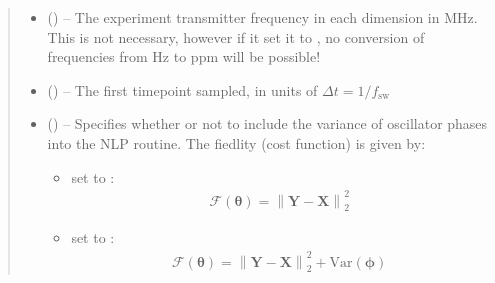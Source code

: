 \documentclass[letterpaper,10pt,english]{sphinxmanual}
\begin{document}
\begin{fulllineitems}
\begin{quote}
\begin{description}
\begin{itemize}
\item {} 
\sphinxAtStartPar
{} (\sphinxstyleliteralemphasis{\sphinxupquote{{[}}}\sphinxstyleliteralemphasis{\sphinxupquote{{]}}}\sphinxstyleliteralemphasis{\sphinxupquote{, }}\sphinxstyleliteralemphasis{\sphinxupquote{{[}}}\sphinxstyleliteralemphasis{\sphinxupquote{, }}\sphinxstyleliteralemphasis{\sphinxupquote{{]} or }}\sphinxstyleliteralemphasis{\sphinxupquote{, }}) – The experiment transmitter frequency in each dimension in MHz.
This is not necessary, however if it set it to , no conversion
of frequencies from Hz to ppm will be possible!

\item {} 
\sphinxAtStartPar
{} (\sphinxstyleliteralemphasis{\sphinxupquote{, }}) – The first timepoint sampled, in units of
\(\Delta t = 1 / f_{\mathrm{sw}}\)

\item {} 
\sphinxAtStartPar
{} (\sphinxstyleliteralemphasis{\sphinxupquote{, }}) – 
\sphinxAtStartPar
Specifies whether or not to include the variance of oscillator
phases into the NLP routine. The fiedlity (cost function) is
given by:
\begin{itemize}
\item {} 
\sphinxAtStartPar
{} set to :
\begin{equation*}
\begin{split}\mathcal{F}\left(\boldsymbol{\theta}\right) =
\left\lVert \boldsymbol{Y} - \boldsymbol{X} \right\rVert_2^2\end{split}
\end{equation*}
\item {} 
\sphinxAtStartPar
{} set to :
\begin{equation*}
\begin{split}\mathcal{F}\left(\boldsymbol{\theta}\right) =
\left\lVert \boldsymbol{Y} - \boldsymbol{X} \right
\rVert_2^2 + \mathrm{Var}\left(\boldsymbol{\phi}\right)\end{split}
\end{equation*}
\end{itemize}



\end{itemize}
\end{description}
\end{quote}
\end{fulllineitems}
\end{document}
